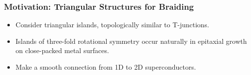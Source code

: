\documentclass[xcolor=dvipsnames,10pt,aspectratio=169]{beamer}
\newcommand{\MO}{Motivation}
\begin{document}
  \begin{frame}
    \frametitle{\MO: Triangular Structures for Braiding}
    \begin{multicols}{2}

    \begin{itemize}
      \item Consider triangular islands, topologically similar to T-junctions.
      \item Islands of three-fold rotational symmetry occur naturally in epitaxial growth on close-packed metal surfaces.
      \item Make a smooth connection from 1D to 2D superconductors.
    \end{itemize}
    \newline

    \begin{figure}
      \end{figure}
    \end{multicols}

  \end{frame}
\end{document}
